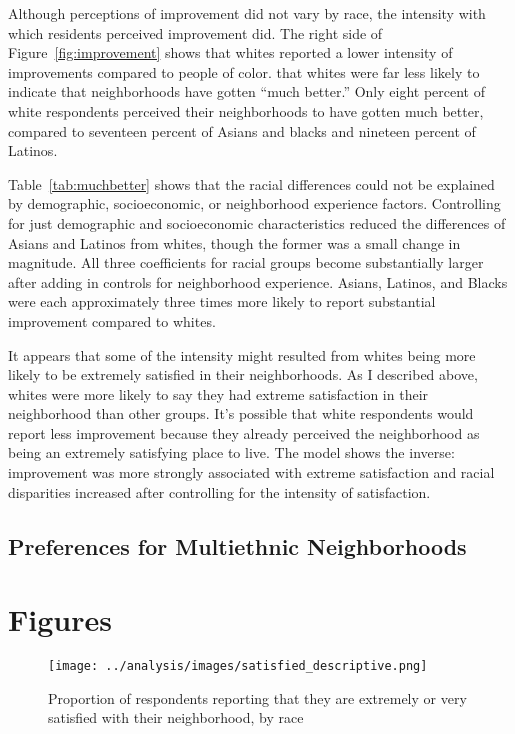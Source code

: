 \documentclass[11pt]{baderart}
\begin{document}

Although perceptions of improvement did not vary by race, the intensity with which residents perceived improvement did. The right side of Figure~\ref{fig:improvement} shows that whites reported a lower intensity of improvements compared to people of color. that whites were far less likely to indicate that neighborhoods have gotten ``much better.'' Only eight percent of white respondents perceived their neighborhoods to have gotten much better, compared to seventeen percent of Asians and blacks and nineteen percent of Latinos. 


Table~\ref{tab:muchbetter} shows that the racial differences could not be explained by demographic, socioeconomic, or neighborhood experience factors. Controlling for just demographic and socioeconomic characteristics reduced the differences of Asians and Latinos from whites, though the former was a small change in magnitude. All three coefficients for racial groups become substantially larger after adding in controls for neighborhood experience. Asians, Latinos, and Blacks were each approximately three times more likely to report substantial improvement compared to whites. 


It appears that some of the intensity might resulted from whites being more likely to be extremely satisfied in their neighborhoods. As I described above, whites were more likely to say they had extreme satisfaction in their neighborhood than other groups. It's possible that white respondents would report less improvement because they already perceived the neighborhood as being an extremely satisfying place to live. The model shows the inverse: improvement was more strongly associated with extreme satisfaction and racial disparities increased after controlling for the intensity of satisfaction. 

\subsection{Preferences for Multiethnic Neighborhoods}


\clearpage
\section{Figures}
\begin{figure}[ht!]
\centering
\texttt{[image: ../analysis/images/satisfied\_descriptive.png]}
\caption{Proportion of respondents reporting that they are extremely or very satisfied with their neighborhood, by race}
\label{fig:satisfaction}
\end{figure}
\end{document}
